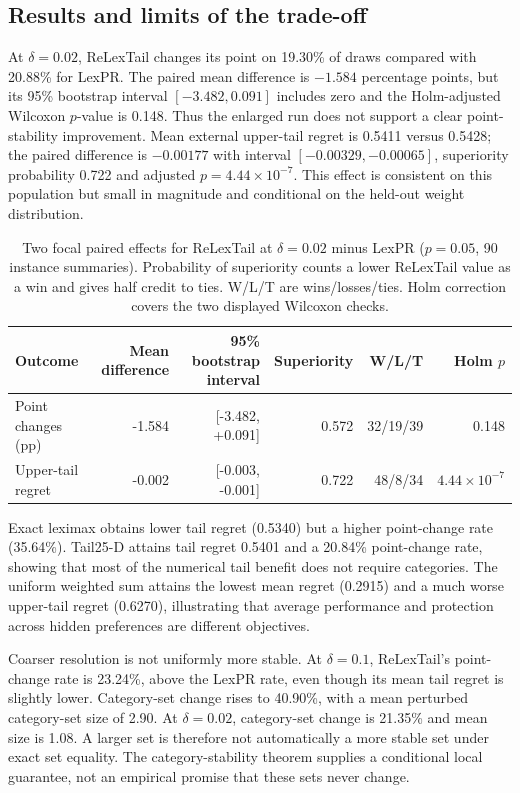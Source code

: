 \subsection{Results and limits of the trade-off}
At $\delta=0.02$, ReLexTail changes its point on 19.30\% of draws compared with 20.88\% for LexPR. The paired mean difference is $-1.584$ percentage points, but its 95\% bootstrap interval $[-3.482,0.091]$ includes zero and the Holm-adjusted Wilcoxon $p$-value is 0.148. Thus the enlarged run does not support a clear point-stability improvement. Mean external upper-tail regret is 0.5411 versus 0.5428; the paired difference is $-0.00177$ with interval $[-0.00329,-0.00065]$, superiority probability 0.722 and adjusted $p=4.44\times10^{-7}$. This effect is consistent on this population but small in magnitude and conditional on the held-out weight distribution.

\begin{table}[tbp]\centering\small
\caption{Two focal paired effects for ReLexTail at $\delta=0.02$ minus LexPR ($p=0.05$, 90 instance summaries). Probability of superiority counts a lower ReLexTail value as a win and gives half credit to ties. W/L/T are wins/losses/ties. Holm correction covers the two displayed Wilcoxon checks.}
\label{tab:effects}
\begin{tabular}{@{}lrrrrr@{}}\toprule
Outcome & Mean difference & 95\% bootstrap interval & Superiority & W/L/T & Holm $p$\\\midrule
Point changes (pp) & -1.584 & [-3.482, +0.091] & 0.572 & 32/19/39 & 0.148 \\
Upper-tail regret & -0.002 & [-0.003, -0.001] & 0.722 & 48/8/34 & $4.44\times10^{-7}$ \\
\bottomrule\end{tabular}\end{table}

Exact leximax obtains lower tail regret (0.5340) but a higher point-change rate (35.64\%). Tail25-D attains tail regret 0.5401 and a 20.84\% point-change rate, showing that most of the numerical tail benefit does not require categories. The uniform weighted sum attains the lowest mean regret (0.2915) and a much worse upper-tail regret (0.6270), illustrating that average performance and protection across hidden preferences are different objectives.

Coarser resolution is not uniformly more stable. At $\delta=0.1$, ReLexTail's point-change rate is 23.24\%, above the LexPR rate, even though its mean tail regret is slightly lower. Category-set change rises to 40.90\%, with a mean perturbed category-set size of 2.90. At $\delta=0.02$, category-set change is 21.35\% and mean size is 1.08. A larger set is therefore not automatically a more stable set under exact set equality. The category-stability theorem supplies a conditional local guarantee, not an empirical promise that these sets never change.


